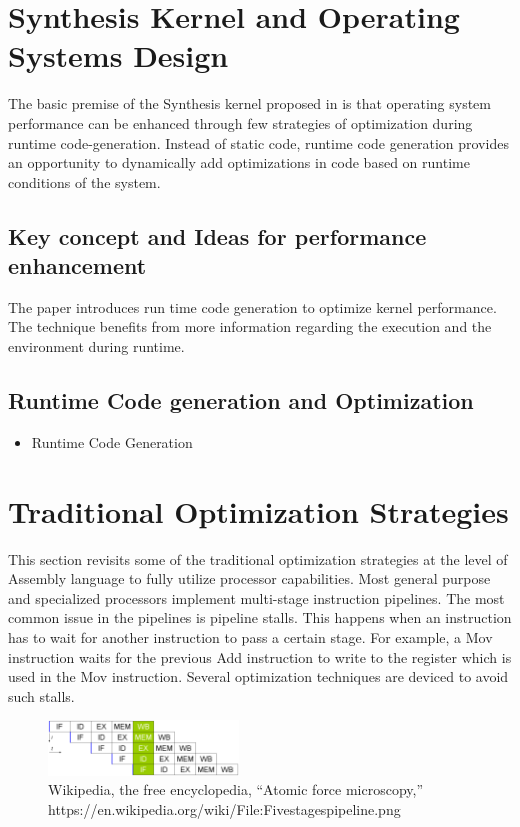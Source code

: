 \documentclass[sigconf]{acmart}
\begin{document}
\section{Synthesis Kernel and Operating Systems Design}
The basic premise of the Synthesis kernel proposed in \cite{synthesis92} is that operating system performance can be enhanced through few strategies of optimization during runtime code-generation. Instead of static code, runtime code generation provides an opportunity to dynamically add optimizations in code based on runtime conditions of the system.

\subsection{Key concept and Ideas for performance enhancement}

The paper \cite{synthesis92} introduces run time code generation to optimize kernel performance. The technique benefits from more information regarding the execution and the environment during runtime. 

\subsection{Runtime Code generation and Optimization}
\begin{itemize}
\item{Runtime Code Generation}
\end{itemize}

\section{Traditional Optimization Strategies}
This section revisits some of the traditional optimization strategies at the level of Assembly language to fully utilize processor capabilities. Most general purpose and specialized processors implement multi-stage instruction pipelines. The most common issue in the pipelines is pipeline stalls. This happens when an instruction has to wait for another instruction to pass a certain stage. For example, a Mov instruction waits for the previous Add instruction to write to the register which is used in the Mov instruction. Several optimization techniques are deviced to avoid such stalls. 

\begin{figure}[h]
  \includegraphics[width=0.45\textwidth]{pipelines}
  \caption{Wikipedia, the free encyclopedia, “Atomic force microscopy,” https://en.wikipedia.org/wiki/File:Fivestagespipeline.png}
\end{figure}
\end{document}
